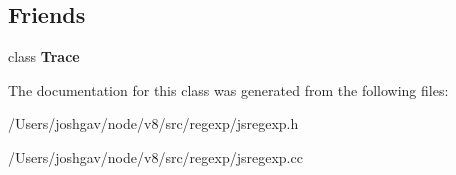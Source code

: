 \subsection*{Friends}
\begin{DoxyCompactItemize}
\item 
class {\bfseries Trace}\hypertarget{classv8_1_1internal_1_1_out_set_a9a7aa541dbcfdac34b25b49217ec39d7}{}\label{classv8_1_1internal_1_1_out_set_a9a7aa541dbcfdac34b25b49217ec39d7}

\end{DoxyCompactItemize}


The documentation for this class was generated from the following files\+:\begin{DoxyCompactItemize}
\item 
/\+Users/joshgav/node/v8/src/regexp/jsregexp.\+h\item 
/\+Users/joshgav/node/v8/src/regexp/jsregexp.\+cc\end{DoxyCompactItemize}
